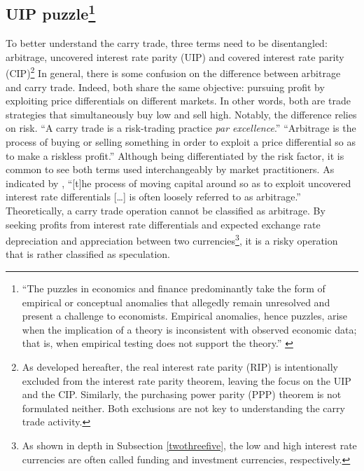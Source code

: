 \documentclass[a4paper, twoside]{templates/ociamthesis}
\begin{document}
\hypertarget{twothreethree}{%
\subsection[UIP puzzle]{\texorpdfstring{UIP puzzle\footnote{``The puzzles in economics and finance predominantly take the form of empirical or conceptual anomalies that allegedly remain unresolved and present a challenge to economists. Empirical anomalies, hence puzzles, arise when the implication of a theory is inconsistent with observed economic data; that is, when empirical testing does not support the theory.'' \autocite[ 4]{moosa2020}}}{UIP puzzle}}\label{twothreethree}}

\noindent To better understand the carry trade, three terms need to be disentangled: arbitrage, uncovered interest rate parity (UIP) and covered interest rate parity (CIP)\footnote{As developed hereafter, the real interest rate parity (RIP) is intentionally excluded from the interest rate parity theorem, leaving the focus on the UIP and the CIP. Similarly, the purchasing power parity (PPP) theorem is not formulated neither. Both exclusions are not key to understanding the carry trade activity.} In general, there is some confusion on the difference between arbitrage and carry trade. Indeed, both share the same objective: pursuing profit by exploiting price differentials on different markets. In other words, both are trade strategies that simultaneously buy low and sell high. Notably, the difference relies on risk. ``A carry trade is a risk-trading practice \emph{par excellence}.'' \autocite[ 74]{gabor2015} ``Arbitrage is the process of buying or selling something in order to exploit a price differential so as to make a riskless profit.'' \autocite[ 47]{copeland2014} Although being differentiated by the risk factor, it is common to see both terms used interchangeably by market practitioners. As indicated by \textcite[ 92]{copeland2014}, ``{[}t{]}he process of moving capital around so as to exploit uncovered interest rate differentials {[}\ldots{]} is often loosely referred to as arbitrage.'' Theoretically, a carry trade operation cannot be classified as arbitrage. By seeking profits from interest rate differentials and expected exchange rate depreciation and appreciation between two currencies\footnote{As shown in depth in Subsection \ref{twothreefive}, the low and high interest rate currencies are often called funding and investment currencies, respectively.}, it is a risky operation that is rather classified as speculation.
\end{document}
